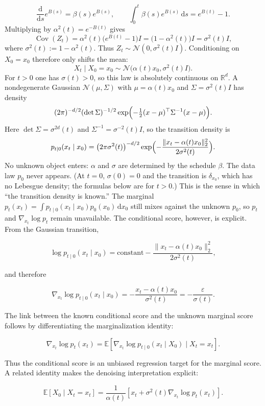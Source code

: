 \documentclass[11pt,a4paper]{article}
\theoremstyle{definition}
\begin{document}
\[
\frac{\mathrm{d}}{\mathrm{d}s}e^{B(s)}=\beta(s)e^{B(s)},
\qquad
\int_0^t\beta(s)e^{B(s)}\,\mathrm{d}s
=
e^{B(t)}-1.
\]
Multiplying by $\alpha^2(t)=e^{-B(t)}$ gives
\[
\operatorname{Cov}(Z_t)
=
\alpha^2(t)\bigl(e^{B(t)}-1\bigr)I
=
\bigl(1-\alpha^2(t)\bigr)I
=
\sigma^2(t)I,
\]
where $\sigma^2(t):=1-\alpha^2(t)$. Thus $Z_t\sim\mathcal{N}(0,\sigma^2(t)I)$.
Conditioning on $X_0=x_0$ therefore only shifts the mean:
\[
X_t\mid X_0=x_0
\sim
\mathcal{N}\bigl(\alpha(t)x_0,\sigma^2(t)I\bigr).
\]
For $t>0$ one has $\sigma(t)>0$, so this law is absolutely continuous on $\mathbb{R}^d$.
A nondegenerate Gaussian $\mathcal{N}(\mu,\Sigma)$ with
$\mu=\alpha(t)x_0$ and $\Sigma=\sigma^2(t)I$ has density
\[
(2\pi)^{-d/2}(\det\Sigma)^{-1/2}
\exp\Bigl(-\tfrac12(x-\mu)^\top\Sigma^{-1}(x-\mu)\Bigr).
\]
Here $\det\Sigma=\sigma^{2d}(t)$ and $\Sigma^{-1}=\sigma^{-2}(t)I$, so the transition
density is
\[
p_{t\mid 0}(x_t\mid x_0)
=
\bigl(2\pi\sigma^2(t)\bigr)^{-d/2}
\exp\Bigl(
-\frac{\lVert x_t-\alpha(t)x_0\rVert_2^2}{2\sigma^2(t)}
\Bigr).
\]
No unknown object enters: $\alpha$ and $\sigma$ are determined by the schedule $\beta$.
The data law $p_0$ never appears. (At $t=0$, $\sigma(0)=0$ and the transition is
$\delta_{x_0}$, which has no Lebesgue density; the formulas below are for $t>0$.)
This is the sense in which ``the transition density is known.'' The marginal
$p_t(x_t)=\int p_{t\mid 0}(x_t\mid x_0)p_0(x_0)\,\mathrm{d}x_0$ still mixes against the
unknown $p_0$, so $p_t$ and $\nabla_{x_t}\log p_t$ remain unavailable.
The conditional score, however, is explicit. From the Gaussian transition,

\[
\log p_{t\mid 0}(x_t\mid x_0)
=\text{constant}
-\frac{\|x_t-\alpha(t)x_0\|_2^2}{2\sigma^2(t)},
\]

and therefore

\[
\nabla_{x_t}\log p_{t\mid 0}(x_t\mid x_0)
=-\frac{x_t-\alpha(t)x_0}{\sigma^2(t)}
=-\frac{\varepsilon}{\sigma(t)}.
\]

The link between the known conditional score and the unknown marginal score follows by
differentiating the marginalization identity:

\[
\nabla_{x_t}\log p_t(x_t)
=\mathbb{E}\left[
\nabla_{x_t}\log p_{t\mid 0}(x_t\mid X_0)
\mid X_t=x_t
\right].
\]

Thus the conditional score is an unbiased regression target for the marginal score. A
related identity makes the denoising interpretation explicit:

\[
\mathbb{E}[X_0\mid X_t=x_t]
=\frac{1}{\alpha(t)}
\left[x_t+\sigma^2(t)\nabla_{x_t}\log p_t(x_t)\right].
\]
\end{document}
